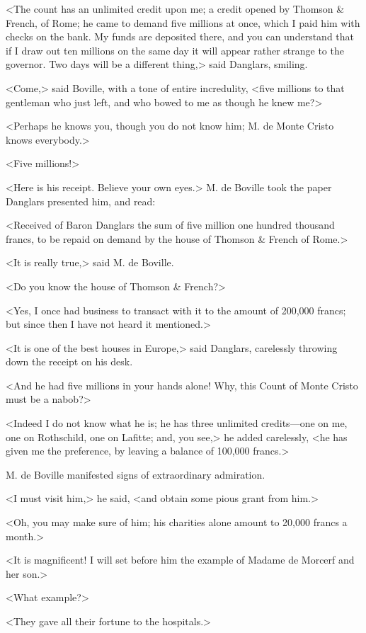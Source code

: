  <The count has an unlimited credit upon me; a credit opened by Thomson \& French, of Rome; he came to demand five millions at once, which I paid him with checks on the bank. My funds are deposited there, and you can understand that if I draw out ten millions on the same day it will appear rather strange to the governor. Two days will be a different thing,> said Danglars, smiling. 

 <Come,> said Boville, with a tone of entire incredulity, <five millions to that gentleman who just left, and who bowed to me as though he knew me?> 

 <Perhaps he knows you, though you do not know him; M. de Monte Cristo knows everybody.> 

 <Five millions!> 

 <Here is his receipt. Believe your own eyes.> M. de Boville took the paper Danglars presented him, and read: 

 <Received of Baron Danglars the sum of five million one hundred thousand francs, to be repaid on demand by the house of Thomson \& French of Rome.> 

 <It is really true,> said M. de Boville. 

 <Do you know the house of Thomson \& French?> 

 <Yes, I once had business to transact with it to the amount of 200,000 francs; but since then I have not heard it mentioned.> 

 <It is one of the best houses in Europe,> said Danglars, carelessly throwing down the receipt on his desk. 

 <And he had five millions in your hands alone! Why, this Count of Monte Cristo must be a nabob?> 

 <Indeed I do not know what he is; he has three unlimited credits—one on me, one on Rothschild, one on Lafitte; and, you see,> he added carelessly, <he has given me the preference, by leaving a balance of 100,000 francs.> 

 M. de Boville manifested signs of extraordinary admiration. 

 <I must visit him,> he said, <and obtain some pious grant from him.> 

 <Oh, you may make sure of him; his charities alone amount to 20,000 francs a month.> 

 <It is magnificent! I will set before him the example of Madame de Morcerf and her son.> 

 <What example?> 

 <They gave all their fortune to the hospitals.> 

